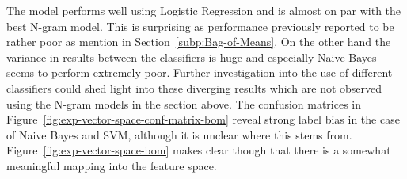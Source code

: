 The model performs well using Logistic Regression and is almost on par with the best N-gram model. This is surprising as performance previously reported to be rather poor as mention in Section~\ref{subp:Bag-of-Means}. On the other hand the variance in results between the classifiers is huge and especially Naive Bayes seems to perform extremely poor. Further investigation into the use of different classifiers could shed light into these diverging results which are not observed using the N-gram models in the section above. The confusion matrices in Figure~\ref{fig:exp-vector-space-conf-matrix-bom} reveal strong label bias in the case of Naive Bayes and SVM, although it is unclear where this stems from. Figure~\ref{fig:exp-vector-space-bom} makes clear though that there is a somewhat meaningful mapping into the feature space. 

